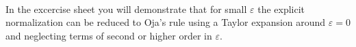 \begin{frame}

\\



\pause

In the excercise sheet you will demonstrate that for small $\varepsilon$ the explicit normalization can be reduced to Oja's rule using a Taylor expansion around $\varepsilon = 0$ and neglecting terms of second or higher order in $\varepsilon$. 

\end{frame}
